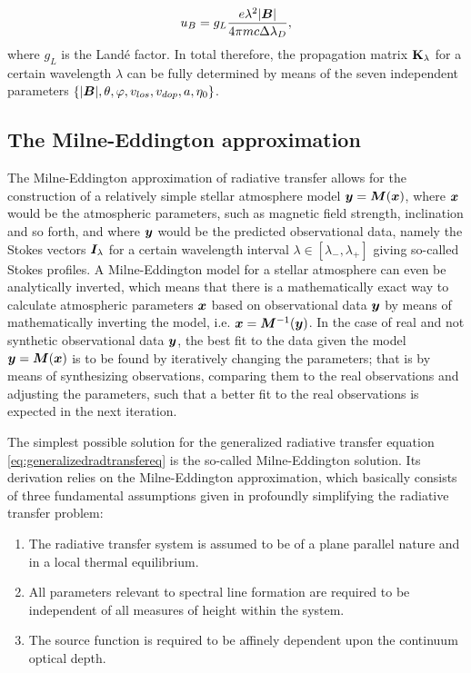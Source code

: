 \documentclass[a4paper,12pt]{report}
\begin{document}
\begin{equation}
u_B = g_L\frac{e\lambda^2|\bm{B}|}{4\pi m c\Delta \lambda_D},
\end{equation} where $g_L$ is the Landé factor. In total therefore, the propagation matrix $\boldsymbol{\mathbf{K}}_\lambda$ for a certain wavelength $\lambda$ can be fully determined by means of the seven independent parameters $\{|\bm{B}|, \theta, \varphi, v_{los}, v_{dop}, a, \eta_0\}$.

\subsection{The Milne-Eddington approximation}\label{sec:MEapproximation}
The Milne-Eddington approximation of radiative transfer allows for the construction of a relatively simple stellar atmosphere model $\bm{y} = \bm{M}(\bm{x})$, where $\bm{x}$ would be the atmospheric parameters, such as  magnetic field strength, inclination and so forth, and where $\bm{y}$ would be the predicted observational data, namely the Stokes vectors $\bm{I}_\lambda$ for a certain wavelength interval $\lambda \in [\lambda_-,\lambda_+]$ giving so-called Stokes profiles. A Milne-Eddington model for a stellar atmosphere can even be analytically inverted, which means that there is a mathematically exact way to calculate atmospheric parameters $\bm{x}$ based on observational data $\bm{y}$ by means of mathematically inverting the model, i.e. $\bm{x} = \bm{M}^{-1}(\bm{y})$. In the case of real and not synthetic observational data $\bm{y}$, the best fit to the data given the model $\bm{y} = \bm{M}(\bm{x})$ is to be found by iteratively changing the parameters; that is by means of synthesizing observations, comparing them to the real observations and adjusting the parameters, such that a better fit to the real observations is expected in the next iteration.

The simplest possible solution for the generalized radiative transfer equation \cref{eq:generalizedradtransfereq} is the so-called Milne-Eddington solution. Its derivation relies on the Milne-Eddington approximation, which basically consists of three fundamental assumptions given in \cite[p.411]{DeglInnocenti.2005} profoundly simplifying the radiative transfer problem:
\begin{enumerate}
\item The radiative transfer system is assumed to be of a plane parallel nature and in a local thermal equilibrium.
\item All parameters relevant to spectral line formation are required to be independent of all measures of height within the system.
\item The source function is required to be affinely dependent upon the continuum optical depth.
\end{enumerate}
\end{document}
